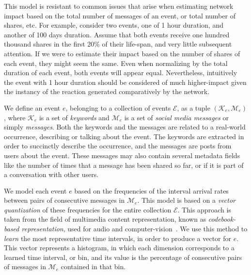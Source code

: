 This model is resistant to common issues that arise when estimating
network impact based on the total number of messages of an event, or
total number of shares, etc. For example, consider two events, one of
1 hour duration, and another of 100 days duration. Assume that both
events receive one hundred thousand shares in the first 20\% of their
life-span, and very little subsequent attention. If we were to
estimate their impact based on the number of shares of each event,
they might seem the same. Even when normalizing by the total duration
of each event, both events will appear equal. Nevertheless,
intuitively the event with 1 hour duration should be considered of
much higher-impact given the instancy of the reaction generated
comparatively by the network.

We define an event $e$, belonging to a collection of events
$\mathcal{E}$, as a tuple $(\mathcal{K}_e, \mathcal{M}_e)$, where
$\mathcal{K}_e$ is a set of \emph{keywords} and $\mathcal{M}_e$ is a
set of \emph{social media messages} or simply \emph{messages}. Both
the keywords and the messages are related to a real-world occurrence,
describing or talking about the event. The keywords are extracted in
order to succinctly describe the occurrence, and the messages are
posts from users about the event. These messages may also contain
several metadata fields like the number of times that a message has
been shared so far, or if it is part of a conversation with other
users.

We model each event $e$ based on the frequencies of the interval
arrival rates between pairs of consecutive messages in
$\mathcal{M}_e$. This model is based on a {\em vector quantization} of
these frequencies for the entire collection $\mathcal{E}$. This
approach is taken from the field of multimedia content representation,
known as {\em codebook-based representation}, used for audio and
computer-vision~\cite{ff,Vaizman}. We use this method to {\em learn}
the most representative time intervals, in order to produce a vector
for $e$. This vector represents a histogram, in which each dimension
corresponds to a learned time interval, or bin, and its value is the
percentage of consecutive pairs of messages in $\mathcal{M}_e$
contained in that bin.

